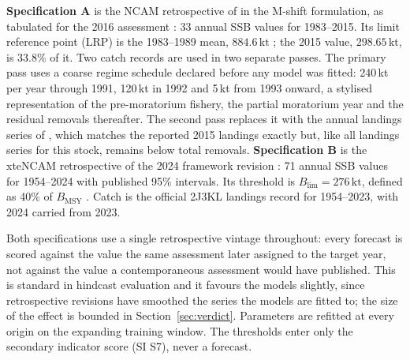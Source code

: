 \documentclass[preprint,11pt,authoryear]{elsarticle}
\theoremstyle{definition}
\theoremstyle{remark}
\newcommand{\kt}{\,\mathrm{kt}}
\newcommand{\Blim}{B_{\mathrm{lim}}}
\begin{document}
\textbf{Specification A} is the NCAM retrospective of \citet{Cadigan2016} in the M-shift formulation, as tabulated for the 2016 assessment \citep[Table A2]{DFO2016}: 33 annual SSB values for 1983--2015. Its limit reference point (LRP) is the 1983--1989 mean, $884.6\kt$ \citep{DFO2009,DFO2016}; the 2015 value, $298.65\kt$, is 33.8\% of it. Two catch records are used in two separate passes. The primary pass uses a coarse regime schedule declared before any model was fitted: 240\,kt per year through 1991, 120\,kt in 1992 and 5\,kt from 1993 onward, a stylised representation of the pre-moratorium fishery, the partial moratorium year and the residual removals thereafter. The second pass replaces it with the annual landings series of \citet{Schijns2021}, which matches the reported 2015 landings exactly but, like all landings series for this stock, remains below total removals. \textbf{Specification B} is the xteNCAM retrospective of the 2024 framework revision \citep[Table 17]{Regular2025}: 71 annual SSB values for 1954--2024 with published 95\% intervals. Its threshold is $\Blim = 276\kt$, defined as 40\% of $B_{\mathrm{MSY}}$ \citep{DFO2024a}. Catch is the official 2J3KL landings record \citep[Table 1]{Regular2025} for 1954--2023, with 2024 carried from 2023.

Both specifications use a single retrospective vintage throughout: every forecast is scored against the value the same assessment later assigned to the target year, not against the value a contemporaneous assessment would have published. This is standard in hindcast evaluation and it favours the models slightly, since retrospective revisions have smoothed the series the models are fitted to; the size of the effect is bounded in Section~\ref{sec:verdict}. Parameters are refitted at every origin on the expanding training window. The thresholds enter only the secondary indicator score (SI S7), never a forecast.
\end{document}
